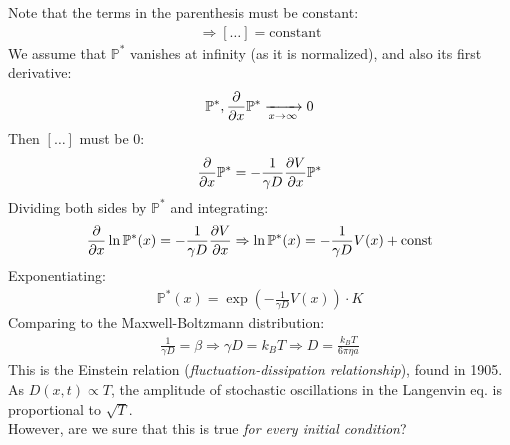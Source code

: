\documentclass[../template.tex]{subfiles}
\begin{document}
Note that the terms in the parenthesis must be constant:
\begin{align*}
    \Rightarrow [\dots] = \text{constant}
\end{align*}
We assume that $\mathbb{P}^*$ vanishes at infinity  (as it is normalized), and also its first derivative:
\begin{align*}
    \mathbb{P}^*, \pdv{x} \mathbb{P}^*  \xrightarrow[x \to \infty]{}  0
\end{align*}
Then $[\dots]$ must be $0$:
\begin{align*}
    \pdv{x} \mathbb{P}^* = - \frac{1}{\gamma D} \pdv{V}{x} \mathbb{P}^* 
\end{align*}  
Dividing both sides by $\mathbb{P}^*$  and integrating:
\begin{align*}
    \pdv{x}\ln \mathbb{P}^*(x) = -\frac{1}{\gamma D} \pdv{V}{x} \Rightarrow \ln \mathbb{P}^*(x) = -\frac{1}{\gamma D} V(x) + \text{const}  
\end{align*}
Exponentiating:
\begin{align*}
    \mathbb{P}^*(x) = \exp\left(-\frac{1}{\gamma D} V(x) \right) \cdot K
\end{align*}
Comparing to the Maxwell-Boltzmann distribution:
\begin{align*}
    \frac{1}{\gamma D} = \beta \Rightarrow \gamma D = k_B T \Rightarrow D = \frac{k_B T}{6 \pi \eta a }  
\end{align*}
This is the Einstein relation (\textit{fluctuation-dissipation relationship}), found in 1905. As $D(x,t) \propto T$, the amplitude of stochastic oscillations in the Langenvin eq. is proportional to $\sqrt{T}$.\\

However, are we sure that this is true \textit{for every initial condition}? 
\end{document}
